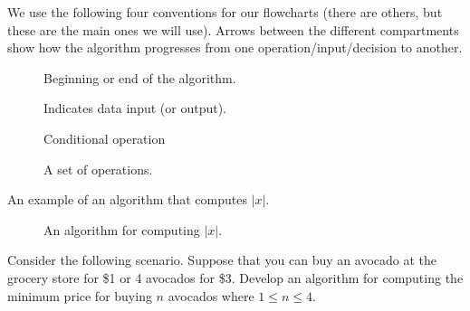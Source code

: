 \documentclass{ximera}
\begin{document}
We use the following four conventions for our flowcharts (there are others, but these are the main ones we will use). Arrows between the different compartments show how the algorithm progresses from one operation/input/decision to another.

\begin{figure}[!ht]
	\centering
	\caption{Beginning or end of the algorithm.}
\end{figure}

\begin{figure}[!ht]
	\centering
	\caption{Indicates data input (or output).}
\end{figure}

\begin{figure}[!ht]
	\centering
	\caption{Conditional operation}
\end{figure}

\begin{figure}[!ht]
	\centering
	\caption{A set of operations.}
\end{figure}

An example of an algorithm that computes $|x|$.

\begin{figure}[!ht]
	\centering
	\caption{An algorithm for computing $|x|$.}
\end{figure}

Consider the following scenario. Suppose that you can buy an avocado at the grocery store for \$1 or 4 avocados for \$3. Develop an algorithm for computing the minimum price for buying $n$ avocados where $1\leq n\leq 4$.
\end{document}

